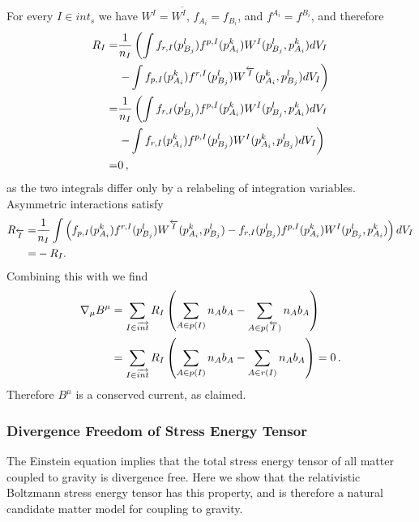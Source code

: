 For every $I\in int_s$ we have $W^I=W^{\overleftarrow{I}}$, $f_{A_i}=f_{B_i}$, and $f^{A_i}=f^{B_i}$, and therefore
\begin{align}
R_I=&\frac{1}{n_I}\left(\int f_{r,I}(p_{B_j}^l)f^{p,I}(p_{A_i}^k)W^I(p_{B_j}^l,p_{A_i}^k)  dV_I \right.\\
&\left. -\int f_{p,I}(p_{A_i}^k)f^{r,I}(p_{B_j}^l)W^{\overleftarrow{I}}(p_{A_i}^k,p_{B_j}^l)  dV_I\right)\notag\\
=&\frac{1}{n_I}\left(\int f_{r,I}(p_{B_j}^l)f^{p,I}(p_{A_i}^k)W^I(p_{B_j}^l,p_{A_i}^k)  dV_I \right.\notag\\
&\left. -\int f_{r,I}(p_{A_i}^k)f^{p,I}(p_{B_j}^l)W^{I}(p_{A_i}^k,p_{B_j}^l)  dV_I\right)\notag\\
=&0\,,\notag
\end{align}
as the two integrals differ only by a relabeling of integration variables.  Asymmetric interactions satisfy
\begin{align}
R_{\overleftarrow{I}}=&\frac{1}{n_I}\int\left(f_{p,I}(p_{A_i}^k)f^{r,I}(p_{B_j}^l)W^{\overleftarrow{I}}(p_{A_i}^k,p_{B_j}^l) 
-f_{r,I}(p_{B_j}^l)f^{p,I}(p_{A_i}^k)W^I(p_{B_j}^l,p_{A_i}^k)\right)  dV_I\notag\\
=&-R_I.
\end{align}
Combining this with  we find
\begin{align}
\nabla_\mu B^\mu&=\sum_{I\in\overrightarrow{int}}R_I\left(\sum_{A\in p(I)} n_Ab_A-\sum_{A\in p(\overleftarrow{I})} n_Ab_A\right)\\
&=\sum_{I\in\overrightarrow{int}}R_I\left(\sum_{A\in p(I)} n_Ab_A-\sum_{A\in r(I)} n_Ab_A\right)=0\,.\notag
\end{align}
Therefore  $B^\mu$ is a conserved current, as claimed.

\subsubsection{Divergence Freedom of Stress Energy Tensor}
The Einstein equation implies that the total stress energy tensor of all matter coupled to gravity is divergence free.  Here we show that the relativistic Boltzmann stress energy tensor  has this property, and is therefore a natural candidate matter model for  coupling to gravity.  

